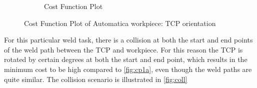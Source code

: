 \begin{figure}[!htbp]
\begin{subfigure}[b]{0.4\textwidth}
		\caption{Cost Function Plot}  
		\label{fig:cp3a}
	\end{subfigure}	
	\caption{Cost Function Plot of Automatica workpiece: TCP orientation}
	\label{fig:cp3}
\end{figure}
For this particular weld task, there is a collision at both the start and end points of the weld path between the TCP and workpiece. For this reason the TCP is rotated by certain degrees at both the start and end point, which results in the minimum cost to be high compared to \ref{fig:cp1a}, even though the weld paths are quite similar. The collision scenario is illustrated in \ref{fig:coll}
